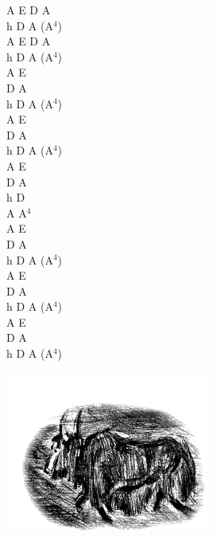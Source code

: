 \documentclass[a5paper, 10pt]{book}
\begin{document}
\begin{minipage}[t]{0.25\textwidth}
  A E D A\\
  h D A (A$^4$)\\
  A E D A\\
  h D A (A$^4$)\\

  A E\\
  D A\\
  h D A (A$^4$)\\

  A E\\
  D A\\
  h D A (A$^4$)\\

  A E\\
  D A\\
  h D\\
  A A$^4$\\
  A E\\
  D A\\
  h D A (A$^4$)\\

  A E\\
  D A\\
  h D A (A$^4$)\\

  A E\\
  D A\\
  h D A (A$^4$)\\
\end{minipage}
\includegraphics[width=0.5\textwidth,center]{images/jak.png}\\


\newpage
\end{document}
